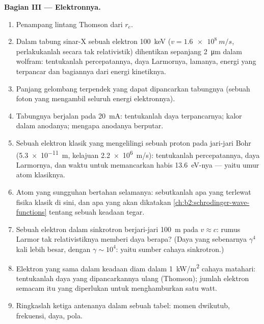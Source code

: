 \begin{problem}
\medskip
\noindent\textbf{Bagian III --- Elektronnya.}
\begin{enumerate}[resume]
  \item Penampang lintang Thomson dari $r_e$.
  \item Dalam tabung sinar-X sebuah elektron \qty{100}{keV} ($v = \qty{1.6e8}{m/s}$,
        perlakukanlah secara tak relativistik) dihentikan sepanjang \qty{2}{\micro m} dalam
        wolfram: tentukanlah percepatannya, daya Larmornya, lamanya, energi
        yang terpancar dan bagiannya dari energi kinetiknya.
  \item Panjang gelombang terpendek yang dapat dipancarkan tabungnya (sebuah foton yang mengambil
        seluruh energi elektronnya).
  \item Tabungnya berjalan pada \qty{20}{mA}: tentukanlah daya terpancarnya; kalor dalam anodanya;
        mengapa anodanya berputar.
  \item Sebuah elektron klasik yang mengelilingi sebuah proton pada jari-jari Bohr
        (\qty{5.3e-11}{m}, kelajuan \qty{2.2e6}{m/s}): tentukanlah percepatannya, daya
        Larmornya, dan waktu untuk memancarkan habis \qty{13.6}{eV}-nya --- yaitu
        umur atom klasiknya.
  \item Atom yang sungguhan bertahan selamanya: sebutkanlah apa yang terlewat fisika klasik
        di sini, dan apa yang akan dikatakan \cref{ch:b2:schrodinger-wave-functions}
        tentang sebuah keadaan tegar.
  \item Sebuah elektron dalam sinkrotron berjari-jari \qty{100}{m} pada $v \approx c$:
        rumus Larmor tak relativistiknya memberi daya berapa? (Daya
        yang sebenarnya $\gamma^4$ kali lebih besar, dengan $\gamma \sim 10^4$: yaitu
        sumber cahaya sinkrotron.)
  \item Elektron yang sama dalam keadaan diam dalam \qty{1}{kW/m^2} cahaya matahari:
        tentukanlah daya yang dipancarkannya ulang (Thomson); jumlah elektron semacam itu
        yang diperlukan untuk menghamburkan satu watt.
  \item Ringkaslah ketiga antenanya dalam sebuah tabel: momen dwikutub,
        frekuensi, daya, pola.
\end{enumerate}
\end{problem}
